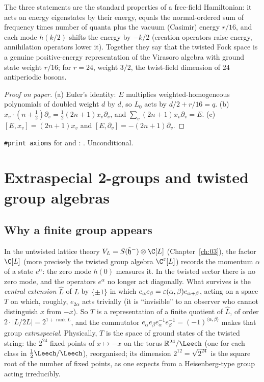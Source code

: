 \begin{physics}
The three statements are the standard properties of a free-field Hamiltonian: it acts on energy eigenstates by their energy, equals the normal-ordered sum of frequency times number of quanta plus the vacuum (Casimir) energy $r/16$, and each mode $h(k/2)$ shifts the energy by $-k/2$ (creation operators raise energy, annihilation operators lower it). Together they say that the twisted Fock space is a genuine positive-energy representation of the Virasoro algebra with ground state weight $r/16$; for $r=24$, weight $3/2$, the twist-field dimension of $24$ antiperiodic bosons.
\end{physics}
\begin{proof}[Proof on paper]
(a) Euler's identity: $E$ multiplies weighted-homogeneous polynomials of doubled weight $d$ by
$d$, so $L_0$ acts by $d/2+r/16=q$.  (b) $x_v\cdot(n+\frac12)\partial_v=\frac12(2n+1)x_v\partial_v$,
and $\sum_v(2n+1)x_v\partial_v=E$.  (c) $[E,x_v]=(2n+1)x_v$ and $[E,\partial_v]=-(2n+1)\partial_v$.
\end{proof}
\begin{status}
\texttt{\#print axioms} for  and : .  Unconditional.
\end{status}

\section{Extraspecial 2-groups and twisted group algebras}\label{ch06:sec:extra}

\subsection{Why a finite group appears}

In the untwisted lattice theory $V_L=S(\hat{\mathfrak h}^-)\otimes\C[L]$ (Chapter~\ref{ch:03}), the
factor $\C[L]$ (more precisely the twisted group algebra $\C^\chsixeps[L]$) records the momentum
$\alpha$ of a state $e^\alpha$: the zero mode $h(0)$ measures it.  In the twisted sector there is no
zero mode, and the operators $e^\alpha$ no longer act diagonally.  What survives is the
\emph{central extension} $\hat L$ of $L$ by $\{\pm1\}$ in which $e_\alpha e_\beta=\varepsilon(\alpha,
\beta)e_{\alpha+\beta}$, acting on a space $T$ on which, roughly, $e_{2\alpha}$ acts trivially (it is
``invisible'' to an observer who cannot distinguish $x$ from $-x$).  So $T$ is a representation of a
finite quotient of $\hat L$, of order $2\cdot|L/2L|=2^{1+\operatorname{rank}L}$, and the commutator
$e_\alpha e_\beta e_\alpha^{-1}e_\beta^{-1}=(-1)^{\langle\alpha,\beta\rangle}$ makes that group
\emph{extraspecial}.  Physically, $T$ is the space of ground states of the twisted string: the
$2^{24}$ fixed points of $x\mapsto-x$ on the torus $\mathbb R^{24}/\Leech$ (one for each class in
$\frac12\Leech/\Leech$), reorganised; its dimension $2^{12}=\sqrt{2^{24}}$ is the square root of the
number of fixed points, as one expects from a Heisenberg-type group acting irreducibly.

